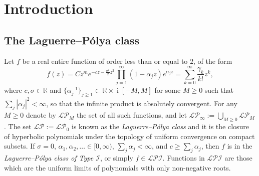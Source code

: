 \documentclass[reqno]{amsart}
\newcommand{\1}{\mathbf{1}}
\DeclareMathOperator{\ii}{i}
\newcommand{\R}{\mathbb{R}}
\def\R{\mathbb{R}}
\newcommand{\LP}{\mathcal{LP}}
\theoremstyle{plain}
\theoremstyle{definition}
\theoremstyle{remark}
\numberwithin{equation}{section}
\begin{document}
	
	
	\maketitle 

	

	


	\section{Introduction}
	\subsection{The Laguerre--P\'olya class}\label{subsec:LP class}
	Let $f$ be a real entire function of order less than or equal to $2$, of the form \begin{equation}\label{eq:func def}
		f(z)=Cz^{m}e^{-cz-\frac{\sigma^2}{2}z^2}\prod_{j=1}^{\infty}\left(1-\alpha_{j}z\right)e^{\alpha_{j}z}=\sum_{k=0}^{\infty}\frac{\gamma_{k}}{k!}z^k,
	\end{equation} where $c,\sigma\in\R$ and $ \{\alpha_{j}^{-1} \}_{j\geq1}\subset\R\times \ii[-M,M]$ for some $M\geq 0$ such that $\sum_j |\alpha_j|^2<\infty$, so that the infinite product is absolutely convergent. For any $M\geq0$ denote by $\LP_{M}$ the set of all such functions, and let $\LP_{\infty}:=\bigcup_{M\geq 0}\LP_{M}$. The set $\LP:=\LP_{0}$ is known as the \emph{Laguerre--P\'olya class} and it is the closure of hyperbolic polynomials under the topology of uniform convergence on compact subsets.   If $\sigma=0$, $\alpha_1,\alpha_{2},\dots\in[0,\infty)$, $\sum_{j}\alpha_{j}<\infty$, and $c\geq\sum_{j}\alpha_{j}$, then $f$ is in the \emph{Laguerre--P\'olya class of Type $\mathcal I$}, or simply $f\in\mathcal{LPI}$. Functions in $\mathcal{LPI}$ are those which are the uniform limits of polynomials with only non-negative roots.
	
\end{document}
